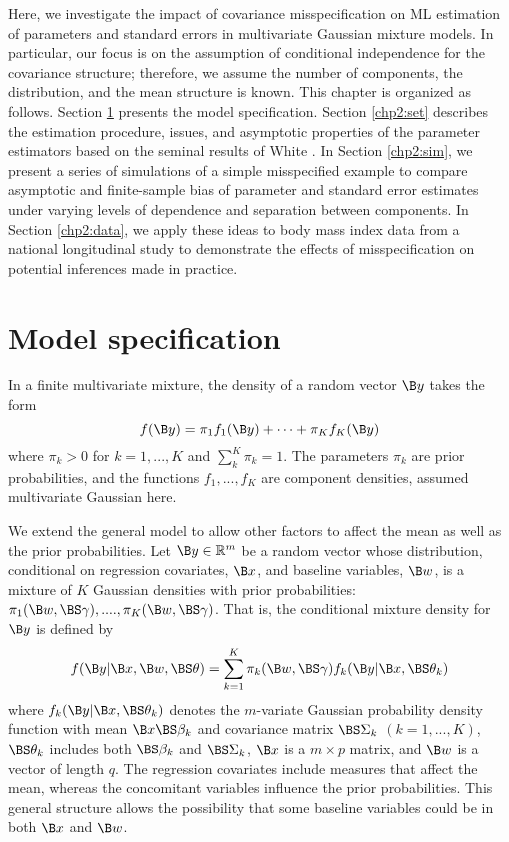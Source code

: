 Here, we investigate the impact of covariance misspecification on ML estimation of parameters and standard errors in multivariate Gaussian mixture models. In particular, our focus is on the assumption of conditional independence for the covariance structure; therefore, we assume the number of components, the distribution, and the mean structure is known. This chapter is organized as follows. Section \ref{chp2:model} presents the model specification. Section \ref{chp2:set} describes the estimation procedure, issues, and asymptotic properties of the parameter estimators based on the seminal results of White \cite{white1982}.  In Section \ref{chp2:sim}, we present a series of simulations of a simple misspecified example to compare asymptotic and finite-sample bias of parameter and standard error estimates under varying levels of dependence and separation between components. In Section \ref{chp2:data}, we apply these ideas to body mass index data from a national longitudinal study to demonstrate the effects of misspecification on potential inferences made in practice. 

\section{Model specification}\label{chp2:model}
In a finite multivariate mixture, the density of a random vector $\B y$ takes the form
$$f(\B y)=\pi_{1}f_{1}(\B y)+\cdots+\pi_{K}f_{K}(\B y)$$
where $\pi_{k}>0$ for $k=1,...,K$ and $\sum^{K}_{k}\pi_{k}=1$. The parameters $\pi_{k}$ are prior probabilities, and the functions $f_{1},...,f_{K}$ are component densities, assumed multivariate Gaussian here. 

We extend the general model to allow other factors to affect the mean as well as the prior probabilities. Let $\B y\in\mathbb{R}^{m}$ be a random vector whose distribution, conditional on regression covariates, $\B x$, and baseline variables, $\B w$, is a mixture of $K$ Gaussian densities with prior probabilities: $\pi_{1}(\B w,\BS \gamma),....,\pi_{K}(\B w,\BS \gamma)$. That is, the conditional mixture density for $\B y$ is defined by
\begin{align}
f(\B y|\B x,\B w,\BS \theta)=\sum^{K}_{k=1}\pi_{k}(\B w,\BS\gamma)f_{k}(\B y|\B x,\BS\theta_{k}) \label{mixdens}
\end{align}
where $f_{k}(\B y|\B x,\BS\theta_{k})$ denotes the $m$-variate Gaussian probability density function with mean $\B x\BS \beta_{k}$ and covariance matrix $\BS\Sigma_{k}$ $(k=1,...,K)$, $\BS\theta_{k}$ includes both $\BS\beta_{k}$ and $\BS\Sigma_{k}$, $\B x$ is a $m\times p$ matrix, and $\B w$ is a vector of length $q$. The regression covariates include measures that affect the mean, whereas the concomitant variables influence the prior probabilities. This general structure allows the possibility that some baseline variables could be in both $\B x$ and $\B w$. 


